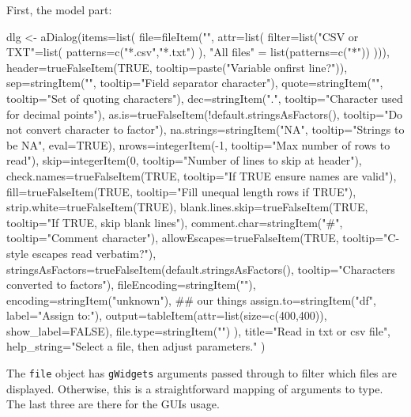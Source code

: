 \documentclass{article}
\newcommand{\code}[1]{\texttt{#1}} %
\newcommand{\pkg}[1]{\texttt{#1}}
\begin{document}
First, the model part:
\begin{Schunk}
\begin{Sinput}
 dlg <- aDialog(items=list(
                  file=fileItem("", attr=list(
                                      filter=list("CSV or TXT"=list(
                                                    patterns=c("*.csv","*.txt")
                                                    ),
                                        "All files" = list(patterns=c("*"))
                                        ))),
                  header=trueFalseItem(TRUE, tooltip=paste("Variable onfirst line?")),
                  sep=stringItem("", tooltip="Field separator character"),
                  quote=stringItem("", tooltip="Set of quoting characters"),
                  dec=stringItem(".", tooltip="Character used for decimal points"),
                  as.is=trueFalseItem(!default.stringsAsFactors(), 
                    tooltip="Do not convert character to factor"),
                  na.strings=stringItem("NA", tooltip="Strings to be NA", eval=TRUE),
                  nrows=integerItem(-1, tooltip="Max number of rows to read"),
                  skip=integerItem(0, tooltip="Number of lines to skip at header"),
                  check.names=trueFalseItem(TRUE, tooltip="If TRUE ensure names are valid"),
                  fill=trueFalseItem(TRUE, tooltip="Fill unequal length rows if TRUE"),
                  strip.white=trueFalseItem(TRUE),
                  blank.lines.skip=trueFalseItem(TRUE, tooltip="If TRUE, skip blank lines"),
                  comment.char=stringItem("#", tooltip="Comment character"),
                  allowEscapes=trueFalseItem(TRUE, tooltip="C-style escapes read verbatim?"),
                  stringsAsFactors=trueFalseItem(default.stringsAsFactors(), 
                    tooltip="Characters converted to factors"),
                  fileEncoding=stringItem(""),
                  encoding=stringItem("unknown"),
                  ## our things
                  assign.to=stringItem("df", label="Assign to:"),
                  output=tableItem(attr=list(size=c(400,400)), show_label=FALSE),
                  file.type=stringItem("")
                  ),
                title="Read in txt or csv file",
                help_string="Select a file, then adjust parameters."
                )
\end{Sinput}
\end{Schunk}
The \code{file} object has \pkg{gWidgets} arguments passed through to
filter which files are displayed. Otherwise, this is a straightforward
mapping of arguments to type. The last three are there for the GUIs usage.
\end{document}

